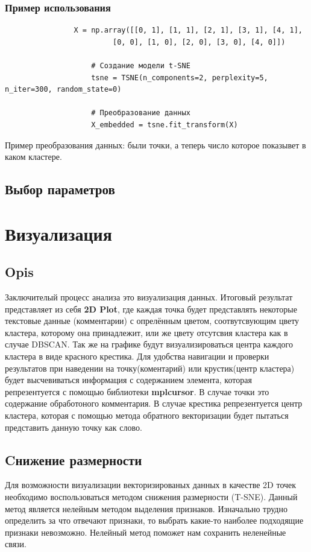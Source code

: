 		\subsubsection{Пример использования}
			\begin{verbatim}
				X = np.array([[0, 1], [1, 1], [2, 1], [3, 1], [4, 1],
             			 [0, 0], [1, 0], [2, 0], [3, 0], [4, 0]])

					# Создание модели t-SNE
					tsne = TSNE(n_components=2, perplexity=5, n_iter=300, random_state=0)

					# Преобразование данных
					X_embedded = tsne.fit_transform(X)
			\end{verbatim}
			
			
			Пример преобразования данных:
				были точки, а теперь число которое показывет в каком кластере.
		
	\subsection{Выбор параметров}
			
	
	
\section{Визуализация}
	\subsection{Opis}
		Заключителый процесс анализа это визуализация данных. Итоговый результат представляет из себя \textbf{2D Plot}, где каждая точка будет представлять некоторые текстовые данные (комментарии) с опрелённым цветом, соотвутсвующим цвету кластера, которому она принадлежит, или же цвету отсутсвия кластера как в случае DBSCAN. Так же на графике будут визуализироваться центра каждого кластера в виде красного крестика. Для удобства навигации и проверки результатов  при наведении на точку(коментарий) или крустик(центр кластера) будет высчевиваться информация с содержанием элемента, которая репрезентуется с помощью библиотеки \textbf{mplcursor}. В случае точки это содержание обработоного комментария. В случае крестика репрезентуется центр кластера, которая с помощью метода обратного векторизации будет пытаться представить данную точку как слово.
	
	\subsection{Cнижение размерности}
		Для возможности визуализации векторизированых данных в качестве 2D точек необходимо воспользоваться методом снижения размерности (T-SNE). Данный метод является нелейным методом выделения признаков. Изначально трудно определить за что отвечают признаки, то выбрать какие-то наиболее подходящие признаки невозможно. Нелейный метод поможет нам сохранить неленейные связи.
		
